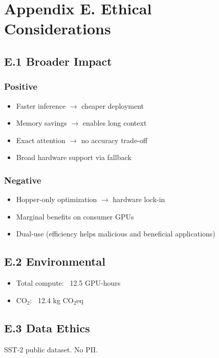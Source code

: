 \section{Appendix E. Ethical Considerations}

\subsection{E.1 Broader Impact}

\subsubsection{Positive}
\begin{itemize}
\item Faster inference $\to$ cheaper deployment
\item Memory savings $\to$ enables long context
\item Exact attention $\to$ no accuracy trade-off
\item Broad hardware support via fallback

\end{itemize}
\subsubsection{Negative}
\begin{itemize}
\item Hopper-only optimization $\to$ hardware lock-in
\item Marginal benefits on consumer GPUs
\item Dual-use (efficiency helps malicious and beneficial applications)

\end{itemize}
\subsection{E.2 Environmental}

\begin{itemize}
\item Total compute: ~12.5 GPU-hours
\item CO$_2$: ~12.4 kg CO$_2$eq

\end{itemize}
\subsection{E.3 Data Ethics}

SST-2 public dataset. No PII.

